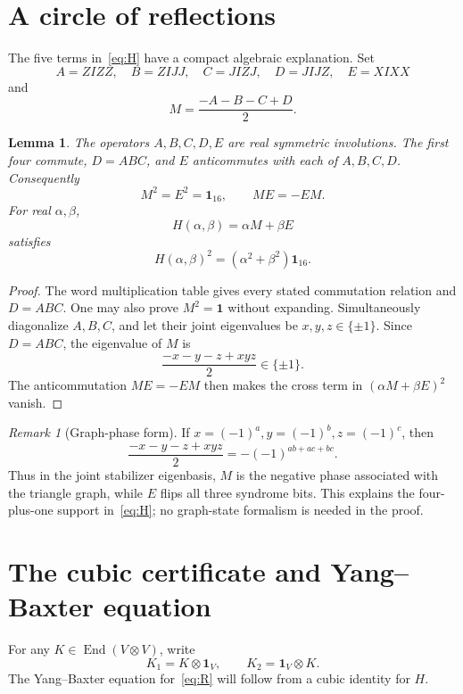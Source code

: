 \documentclass[11pt]{article}
\newtheorem{lemma}[theorem]{Lemma}
\theoremstyle{remark}
\newtheorem{remark}[theorem]{Remark}
\newcommand{\Id}{\mathbf 1}
\newcommand{\End}{\operatorname{End}}
\begin{document}
\section{A circle of reflections}\label{sec:reflection}

The five terms in~\eqref{eq:H} have a compact algebraic explanation.  Set
\[
  A=ZIZZ,\quad B=ZIJJ,\quad C=JIZJ,\quad D=JIJZ,\quad E=XIXX
\]
and
\begin{equation}
  M=\frac{-A-B-C+D}{2}.
  \label{eq:M}
\end{equation}

\begin{lemma}\label{lem:reflection}
The operators \(A,B,C,D,E\) are real symmetric involutions.
The first four commute, \(D=ABC\), and \(E\) anticommutes with each of
\(A,B,C,D\).  Consequently
\[
  M^2=E^2=\Id_{16},\qquad ME=-EM.
\]
For real \(\alpha,\beta\),
\[
  H(\alpha,\beta)=\alpha M+\beta E
\]
satisfies
\[
  H(\alpha,\beta)^2=(\alpha^2+\beta^2)\Id_{16}.
\]
\end{lemma}

\begin{proof}
The word multiplication table gives every stated commutation relation and
\(D=ABC\).  One may also prove \(M^2=\Id\) without expanding.  Simultaneously
diagonalize \(A,B,C\), and let their joint eigenvalues be
\(x,y,z\in\{\pm1\}\).  Since \(D=ABC\), the eigenvalue of \(M\) is
\[
  \frac{-x-y-z+xyz}{2}\in\{\pm1\}.
\]
The anticommutation \(ME=-EM\) then makes the cross term in
\((\alpha M+\beta E)^2\) vanish.
\end{proof}

\begin{remark}[Graph-phase form]
If \(x=(-1)^a,y=(-1)^b,z=(-1)^c\), then
\[
  \frac{-x-y-z+xyz}{2}=-(-1)^{ab+ac+bc}.
\]
Thus in the joint stabilizer eigenbasis, \(M\) is the negative phase
associated with the triangle graph, while \(E\) flips all three syndrome
bits.  This explains the four-plus-one support in~\eqref{eq:H}; no graph-state
formalism is needed in the proof.
\end{remark}

\section{The cubic certificate and Yang--Baxter equation}\label{sec:ybe}

For any \(K\in\End(V\otimes V)\), write
\[
  K_1=K\otimes\Id_V,\qquad K_2=\Id_V\otimes K.
\]
The Yang--Baxter equation for~\eqref{eq:R} will follow from a cubic identity
for \(H\).
\end{document}
